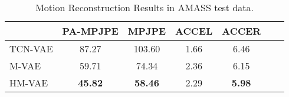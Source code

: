 \begin{table}[t!]
\small
\begin{center}
\footnotesize{
\setlength{\tabcolsep}{8pt}
\begin{tabular}{@{}l||cccccc@{}} 
\hline
 & PA-MPJPE  & MPJPE & ACCEL & ACCER \\ \hline\hline
TCN-VAE & 87.27 & 103.60 & 1.66 & 6.46 \\ \hline 
M-VAE & 59.71 & 74.34 & 2.36 & 6.15 \\ \hline
HM-VAE & \textbf{45.82} & \textbf{58.46} & 2.29 & \textbf{5.98} \\ \hline
\end{tabular}
}
\end{center}
\vspace{-5mm}
\caption{\small Motion Reconstruction Results in AMASS test data.}
\label{table:motion_rec}
\vspace{-6mm}
\end{table}


























